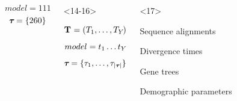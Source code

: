 \begin{frame}
\begin{columns}[c]
\begin{onlyenv}
\begin{minipage}[c][0.5\textheight][c]{\linewidth}
\begin{displaybox}[0.95\linewidth]
\begin{minipage}[c][0.45\textheight][c]{0.95\linewidth}
                        \[
                            model = 111
                        \]\vspace{0mm}
                        \[
                            \boldsymbol{\tau_{}} = \{260\}
                        \]\vspace{0mm}
                    \end{minipage}
                \end{displaybox}
            \end{minipage}
        \end{onlyenv}
        \begin{onlyenv}<14-16>
            \begin{minipage}[c][0.5\textheight][c]{\linewidth}
                \begin{displaybox}[0.95\linewidth]
                    \begin{minipage}[c][0.45\textheight][c]{0.95\linewidth}
                        \[
                            \mathbf{T_{}} = (T_{1},\ldots,T_{Y_{}})
                        \]\vspace{0mm}
                        \[
                            model = t_{1}\ldots t_{Y_{}}
                        \]\vspace{0mm}
                        \[
                            \boldsymbol{\tau_{}} = \{\tau_{1},\ldots,\tau_{\lvert \boldsymbol{\tau_{}} \rvert}\}
                        \]\vspace{0mm}
                    \end{minipage}
                \end{displaybox}
            \end{minipage}
        \end{onlyenv}
        \begin{onlyenv}<17>
            \begin{minipage}[c][0.5\textheight][c]{\linewidth}
                \begin{mydescription}
                    \item[\alignmentVector] Sequence alignments
                    \item[\divTimeMapVector] Divergence times
                    \item[\geneTreeVector] Gene trees
                    \item[\demographicParamVector] Demographic parameters
                \end{mydescription}

\end{minipage}
\end{onlyenv}
\end{columns}
\end{frame}
